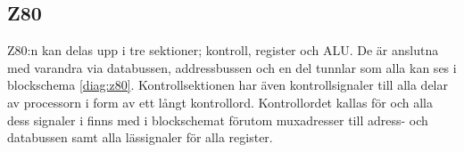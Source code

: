 \documentclass[main.tex]{subfiles}
\begin{document}
\subsection{Z80}
Z80:n kan delas upp i tre sektioner; kontroll, register och ALU. De är anslutna
med varandra via databussen, addressbussen och en del tunnlar som alla kan ses
i blockschema \ref{diag:z80}. Kontrollsektionen har även kontrollsignaler till
alla delar av processorn i form av ett långt kontrollord. Kontrollordet kallas
för  och alla dess signaler i finns med i blockschemat förutom
muxadresser till adress- och databussen samt alla lässignaler för alla
register.





\newpage
\end{document}
